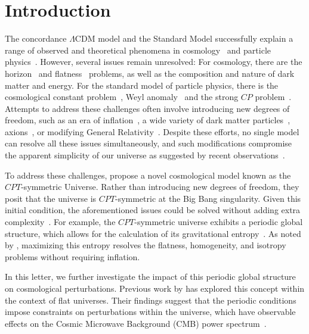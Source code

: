 \documentclass[%
 reprint,
 amsmath,amssymb,
 prl,
]{revtex4-2}
\begin{document}
\section{Introduction}
The concordance $\Lambda$CDM model and the Standard Model successfully explain a range of observed and theoretical phenomena in cosmology~\cite{2020A&A...641A...6P} and particle physics~\cite{1995iqft.book.....P}. However, several issues remain unresolved: For cosmology, there are the horizon~\cite{1972grun.book.....D} and flatness~\cite{1983Natur.305..673C} problems, as well as the composition and nature of dark matter and energy. For the standard model of particle physics, there is the cosmological constant problem~\cite{1989RvMP...61....1W}, Weyl anomaly~\cite{1994CQGra..11.1387D} and the strong $CP$ problem~\cite{1976PhRvL..37....8T}. Attempts to address these challenges often involve introducing new degrees of freedom, such as an era of inflation~\cite{1981PhRvD..23..347G}, a wide variety of dark matter particles~\cite{2019Univ....5..213P}, axions~\cite{1977PhRvL..38.1440P}, or modifying General Relativity~\cite{2012PhR...513....1C}. Despite these efforts, no single model can resolve all these issues simultaneously, and such modifications compromise the apparent simplicity of our universe as suggested by recent observations~\cite{2020A&A...641A...6P, 2024ApJ...966..157F}.

To address these challenges, \citet{2018PhRvL.121y1301B, 2022AnPhy.43868767B} propose a novel cosmological model known as the $CPT$-symmetric Universe. Rather than introducing new degrees of freedom, they posit that the universe is $CPT$-symmetric at the Big Bang singularity. Given this initial condition, the aforementioned issues could be solved without adding extra complexity~\cite{2021arXiv211006258B,2022arXiv220810396B,2024PhLB..84938442B,2023arXiv230200344T}. For example, the $CPT$-symmetric universe exhibits a periodic global structure, which allows for the calculation of its gravitational entropy~\cite{1977PhRvD..15.2752G}. As noted by \citet{2024PhLB..84938443T}, maximizing this entropy resolves the flatness, homogeneity, and isotropy problems without requiring inflation.

In this letter, we further investigate the impact of this periodic global structure on cosmological perturbations. Previous work by \citet{2022PhRvD.105h3514L} has explored this concept within the context of flat universes. Their findings suggest that the periodic conditions impose constraints on perturbations within the universe, which have observable effects on the Cosmic Microwave Background (CMB) power spectrum~\cite{2022PhRvD.105h3515B,2022PhRvD.105l3508P}.
\end{document}
